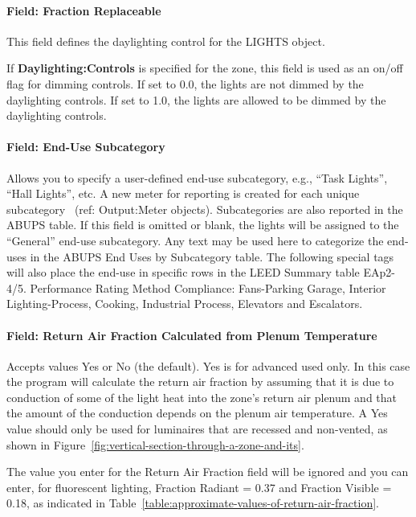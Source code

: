\paragraph{Field: Fraction Replaceable}\label{field-fraction-replaceable}

This field defines the daylighting control for the LIGHTS object.

If \textbf{Daylighting:Controls} is specified for the zone, this field is used as an on/off flag for dimming controls. If set to 0.0, the lights are not dimmed by the daylighting controls. If set to 1.0, the lights are allowed to be dimmed by the daylighting controls.

\paragraph{Field: End-Use Subcategory}\label{field-end-use-subcategory-002}

Allows you to specify a user-defined end-use subcategory, e.g., ``Task Lights'', ``Hall Lights'', etc. A new meter for reporting is created for each unique subcategory~ (ref: Output:Meter objects). Subcategories are also reported in the ABUPS table. If this field is omitted or blank, the lights will be assigned to the ``General'' end-use subcategory. Any text may be used here to categorize the end-uses in the ABUPS End Uses by Subcategory table. The following special tags will also place the end-use in specific rows in the LEED Summary table EAp2-4/5. Performance Rating Method Compliance:  Fans-Parking Garage, Interior Lighting-Process, Cooking, Industrial Process, Elevators and Escalators.


\paragraph{Field: Return Air Fraction Calculated from Plenum Temperature}\label{field-return-air-fraction-calculated-from-plenum-temperature}

Accepts values Yes or No (the default). Yes is for advanced used only. In this case the program will calculate the return air fraction by assuming that it is due to conduction of some of the light heat into the zone's return air plenum and that the amount of the conduction depends on the plenum air temperature. A Yes value should only be used for luminaires that are recessed and non-vented, as shown in Figure~\ref{fig:vertical-section-through-a-zone-and-its}.

The value you enter for the Return Air Fraction field will be ignored and you can enter, for fluorescent lighting, Fraction Radiant = 0.37 and Fraction Visible = 0.18, as indicated in Table~\ref{table:approximate-values-of-return-air-fraction}.

